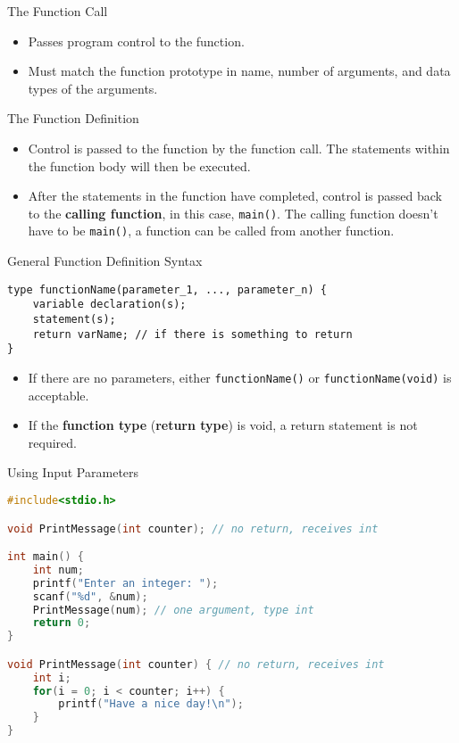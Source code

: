\documentclass[graphics]{beamer}
\begin{document}
\begin{frame}{The Function Call}
    \begin{itemize}
        \item Passes program control to the function.
        \item Must match the function prototype in name, number of arguments, and data types of the arguments.
    \end{itemize}
\end{frame}

\begin{frame}{The Function Definition}
    \begin{itemize}
        \item Control is passed to the function by the function call. The statements within the function body will then be executed.
        \item After the statements in the function have completed, control is passed back to the \textbf{calling function}, in this case, \texttt{main()}. The calling function doesn't have to be \texttt{main()}, a function can be called from another function.
    \end{itemize}
\end{frame}

\begin{frame}[fragile]{General Function Definition Syntax}
    \begin{verbatim}
type functionName(parameter_1, ..., parameter_n) {
    variable declaration(s);
    statement(s);
    return varName; // if there is something to return
}
    \end{verbatim}
    \begin{itemize}
        \item If there are no parameters, either \texttt{functionName()} or \texttt{functionName(void)} is acceptable.
        \item If the \textbf{function type} (\textbf{return type}) is void, a return statement is not required.
    \end{itemize}
\end{frame}

\begin{frame}[fragile]{Using Input Parameters}
    \begin{lstlisting}[language=C,basicstyle=\footnotesize,keywordstyle=\color{blue},commentstyle=\color{green},showstringspaces=false,stringstyle=\color{red}]
#include<stdio.h>

void PrintMessage(int counter); // no return, receives int

int main() {
    int num;
    printf("Enter an integer: ");
    scanf("%d", &num);
    PrintMessage(num); // one argument, type int
    return 0;
}

void PrintMessage(int counter) { // no return, receives int
    int i;
    for(i = 0; i < counter; i++) {
        printf("Have a nice day!\n");
    }
}
    \end{lstlisting}
\end{frame}
\end{document}
